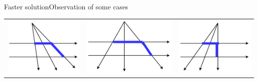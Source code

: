 \documentclass{beamer}
\begin{document}
\begin{frame}{Faster solution}{Observation of some cases}
    \begin{tabular}{c c c}
        \begin{minipage}{0.3\textwidth}
            \includegraphics[width=\linewidth]{example1.pdf}
        \end{minipage}
        & 
         \begin{minipage}{0.3\textwidth}
            \includegraphics[width=\linewidth]{example2.pdf}
        \end{minipage}
        & 
         \begin{minipage}{0.3\textwidth}
            \includegraphics[width=\linewidth]{example3.pdf}

\end{minipage}
\end{tabular}
\end{frame}
\end{document}
